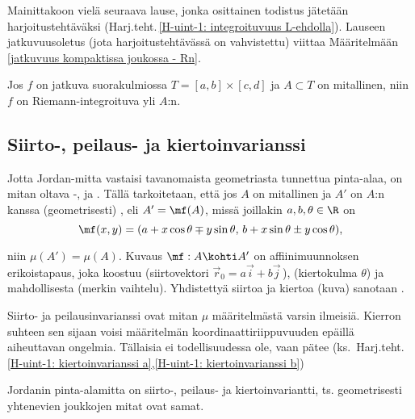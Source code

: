 Mainittakoon vielä seuraava lause, jonka osittainen todistus jätetään harjoitustehtäväksi
(Harj.teht.\,\ref{H-uint-1: integroituvuus L-ehdolla}). Lauseen jatkuvuusoletus
(jota harjoitustehtävässä on vahvistettu) viittaa Määritelmään
\ref{jatkuvuus kompaktissa joukossa - Rn}.
\begin{*Lause} \label{jatkuvan funktion integroituvuus tasossa}
Jos $f$ on jatkuva suorakulmiossa $T=[a,b]\times[c,d]$ ja $A \subset T$ on mitallinen, niin
$f$ on Riemann-integroituva yli $A$:n.
\end{*Lause} 

\subsection{Siirto-, peilaus- ja kiertoinvarianssi}

Jotta Jordan-mitta vastaisi tavanomaista geometriasta tunnettua pinta-alaa, on mitan oltava
-,  ja  . Tällä tarkoitetaan, että jos $A$ on
mitallinen ja $A'$ on $A$:n kanssa (geometrisesti)
%
, eli $A'=\mf(A)$, missä joillakin $a,b,\theta\in\R$ on
\[
\mf(x,y)=(a+x\cos\theta \mp y\sin\theta,\,b+x\sin\theta \pm y\cos\theta),
\]
\begin{figure}[H]
\begin{center}

\end{center}
\end{figure}
niin $\mu(A')=\mu(A)$. Kuvaus $\mf:A \kohti A'$ on affiinimuunnoksen erikoistapaus, joka
koostuu  (siirtovektori $\vec r_0=a\vec i + b\vec j\,$),   
(kiertokulma $\theta$) ja mahdollisesta  (merkin vaihtelu). Yhdistettyä
siirtoa ja kiertoa (kuva) sanotaan
%
.  

Siirto- ja peilausinvarianssi ovat mitan $\mu$ määritelmästä varsin ilmeisiä. Kierron suhteen 
sen sijaan voisi määritelmän koordinaattiriippuvuuden epäillä aiheuttavan ongelmia. Tällaisia
ei todellisuudessa ole, vaan pätee
(ks.\ Harj.teht.\,\ref{H-uint-1: kiertoinvarianssi a},\ref{H-uint-1: kiertoinvarianssi b})
\begin{Lause}
Jordanin pinta-alamitta on siirto-, peilaus- ja kiertoinvariantti, ts. geometrisesti yhtenevien
joukkojen mitat ovat samat.
\end{Lause}

